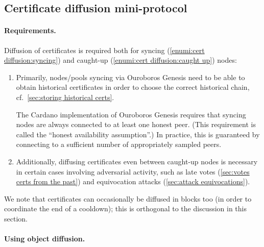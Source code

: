 \subsection{Certificate diffusion mini-protocol}%
\label{sec:certificate-diffusion}

\paragraph{Requirements.}

Diffusion of certificates is required both for syncing (\ref{enumi:cert diffusion:syncing}) and caught-up (\ref{enumi:cert diffusion:caught up}) nodes:

\begin{enumerate}
\item\label{enumi:cert diffusion:syncing}
  Primarily, nodes/pools syncing via Ouroboros Genesis need to be able to obtain historical certificates in order to choose the correct historical chain, cf.~\cref{sec:storing historical certs}.

  The Cardano implementation of Ouroboros Genesis \parencite{genesis-implementation-documentation} requires that syncing nodes are always connected to at least one honest peer.
(This requirement is called the \enquote{honest availability assumption}.)
In practice, this is guaranteed by connecting to a sufficient number of appropriately sampled peers.
%
\item\label{enumi:cert diffusion:caught up}
  Additionally, diffusing certificates even between caught-up nodes is necessary in certain cases involving adversarial activity, such as late votes (\cref{sec:votes certs from the past}) and equivocation attacks (\cref{sec:attack equivocations}).
\end{enumerate}

We note that certificates can occasionally be diffused in blocks too (in order to coordinate the end of a cooldown); this is orthogonal to the discussion in this section.

\paragraph{Using object diffusion.}

